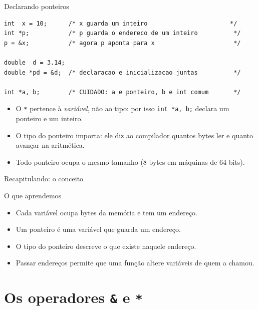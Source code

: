 \documentclass[aspectratio=169]{beamer}
\begin{document}
\begin{frame}[fragile]{Declarando ponteiros}
\begin{lstlisting}
int  x = 10;      /* x guarda um inteiro                       */
int *p;           /* p guarda o endereco de um inteiro          */
p = &x;           /* agora p aponta para x                      */

double  d = 3.14;
double *pd = &d;  /* declaracao e inicializacao juntas          */

int *a, b;        /* CUIDADO: a e ponteiro, b e int comum       */
\end{lstlisting}
  \begin{itemize}
    \item O \texttt{*} pertence à \emph{variável}, não ao tipo: por isso
      \texttt{int *a, b;} declara um ponteiro e um inteiro.
    \item O tipo do ponteiro importa: ele diz ao compilador quantos bytes ler
      e quanto avançar na aritmética.
    \item Todo ponteiro ocupa o mesmo tamanho (8 bytes em máquinas de 64 bits).
  \end{itemize}
\end{frame}

\begin{frame}{Recapitulando: o conceito}
  \begin{block}{O que aprendemos}
    \begin{itemize}
      \item Cada variável ocupa bytes da memória e tem um endereço.
      \item Um ponteiro é uma variável que guarda um endereço.
      \item O tipo do ponteiro descreve o que existe naquele endereço.
      \item Passar endereços permite que uma função altere variáveis de quem
        a chamou.
    \end{itemize}
  \end{block}
\end{frame}

\section{Os operadores \texorpdfstring{\texttt{\&}}{\&} e \texorpdfstring{\texttt{*}}{*}}
\end{document}
